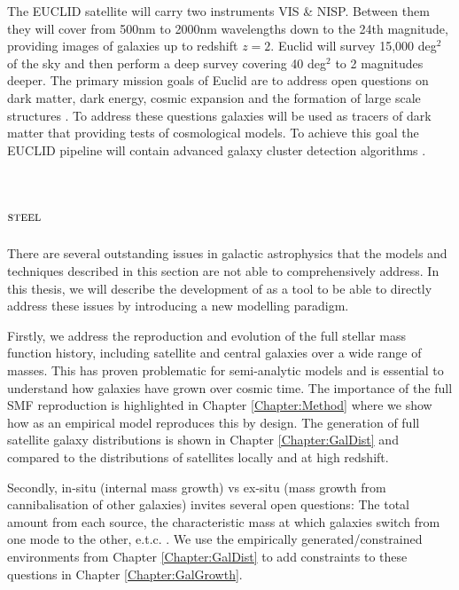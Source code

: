 The EUCLID satellite will carry two instruments VIS \& NISP. Between them they will cover from 500nm to 2000nm wavelengths down to the 24th magnitude, providing images of galaxies up to redshift $z = 2$. Euclid will survey 15,000 deg$^2$ of the sky and then perform a deep survey covering 40 deg$^2$ to 2 magnitudes deeper. The primary mission goals of Euclid are to address open questions on dark matter, dark energy, cosmic expansion and the formation of large scale structures \cite{Amendola2018CosmologySatellite}. To address these questions galaxies will be used as tracers of dark matter that providing tests of cosmological models. To achieve this goal the EUCLID pipeline will contain advanced galaxy cluster detection algorithms \cite{Adam2019EuclidSelection}.


\section{$\textsc{steel}$}

There are several outstanding issues in galactic astrophysics that the models and techniques described in this section are not able to comprehensively address. In this thesis, we will describe the development of \steel as a tool to be able to directly address these issues by introducing a new modelling paradigm. 


Firstly, we address the reproduction and evolution of the full stellar mass function history, including satellite and central galaxies over a wide range of masses. This has proven problematic for semi-analytic models \cite{Asquith2018CosmicModels} and is essential to understand how galaxies have grown over cosmic time.
The importance of the full SMF reproduction is highlighted in Chapter \ref{Chapter:Method} where we show how \steel as an empirical model reproduces this by design. The generation of full satellite galaxy distributions is shown in Chapter \ref{Chapter:GalDist} and compared to the distributions of satellites locally and at high redshift. 

Secondly, in-situ (internal mass growth) vs ex-situ (mass growth from cannibalisation of other galaxies) invites several open questions: The total amount from each source, the characteristic mass at which galaxies switch from one mode to the other, e.t.c.  \cite[e.g.]{Cattaneo2011HowMass, Moster2018Emerge10, Behroozi2019UniverseMachine:010, Bernardi2011Curvature1011M, Shankar2015}. We use the empirically generated/constrained environments from Chapter \ref{Chapter:GalDist} to add constraints to these questions in Chapter \ref{Chapter:GalGrowth}.

